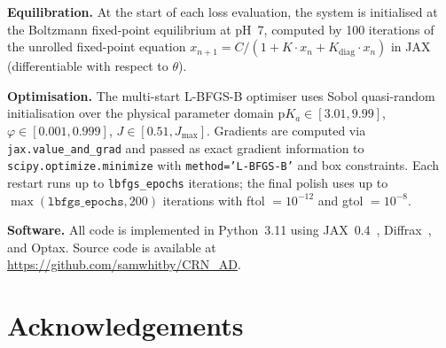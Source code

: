 \documentclass[10pt,twocolumn]{article}
\begin{document}
\textbf{Equilibration.}
At the start of each loss evaluation, the system is initialised at the Boltzmann fixed-point equilibrium at pH~7, computed by 100 iterations of the unrolled fixed-point equation $x_{n+1} = C/(1 + K \cdot x_n + K_\mathrm{diag} \cdot x_n)$ in JAX (differentiable with respect to $\theta$).

\textbf{Optimisation.}
The multi-start L-BFGS-B optimiser uses Sobol quasi-random initialisation over the physical parameter domain $\mathrm{p}K_a \in [3.01, 9.99]$, $\varphi \in [0.001, 0.999]$, $J \in [0.51, J_\mathrm{max}]$.
Gradients are computed via \texttt{jax.value\_and\_grad} and passed as exact gradient information to \texttt{scipy.optimize.minimize} with \texttt{method='L-BFGS-B'} and box constraints.
Each restart runs up to \texttt{lbfgs\_epochs} iterations; the final polish uses up to $\max(\texttt{lbfgs\_epochs}, 200)$ iterations with ftol $= 10^{-12}$ and gtol $= 10^{-8}$.

\textbf{Software.}
All code is implemented in Python~3.11 using JAX~0.4~\cite{jax2018}, Diffrax~\cite{kidger2022}, and Optax.
Source code is available at \url{https://github.com/samwhitby/CRN_AD}.

\section*{Acknowledgements}



\end{document}
